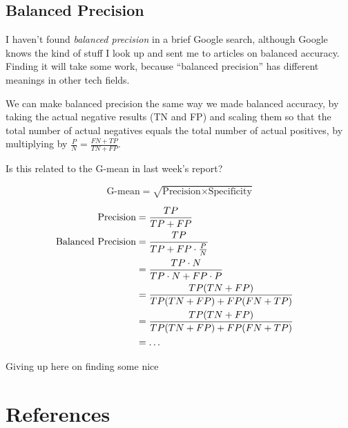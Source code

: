 \documentclass[11pt]{article}
\begin{document}
\begin{spacing}{1.2}
\subsection{Balanced Precision}

I haven't found {\it balanced precision} in a brief Google search, although Google knows the kind of stuff I look up and sent me to articles on balanced accuracy.  Finding it will take some work, because ``balanced precision'' has different meanings in other tech fields.  

We can make balanced precision the same way we made balanced accuracy, by taking the actual negative results (TN and FP) and scaling them  so that the total number of actual negatives equals the total number of actual positives, by multiplying by $\frac{P}{N} = \frac{FN+TP}{TN+FP}$.

Is this related to the G-mean in last week's report?

$$\text{G-mean} = \sqrt{\text{Precision} \times \text{Specificity}}$$

\begin{align*}
	\text{Precision} &= \frac{TP}{TP+FP} \cr
	\text{Balanced Precision} &= \frac{TP}{TP+FP \cdot \frac{P}{N}} \cr
		&= \frac{TP \cdot N}{TP \cdot N + FP \cdot P} \cr
		&= \frac{TP (TN+FP)}{TP(TN+FP) + FP (FN+TP)} \cr
		&= \frac{TP (TN+FP)}{TP(TN+FP) + FP (FN+TP)} \cr
		&= \dots \cr
\end{align*}

Giving up here on finding some nice


\section{References}
\label{sec:references}
\printbibliography[heading=none]


\clearpage
{}
\printindex

\end{spacing}
\end{document}

